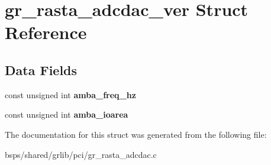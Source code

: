 \hypertarget{structgr__rasta__adcdac__ver}{}\section{gr\+\_\+rasta\+\_\+adcdac\+\_\+ver Struct Reference}
\label{structgr__rasta__adcdac__ver}
\subsection*{Data Fields}
\begin{DoxyCompactItemize}
\item 
\mbox{\label{structgr__rasta__adcdac__ver_af84b68e6409b5581ed521579a220da3f}} 
const unsigned int {\bfseries amba\+\_\+freq\+\_\+hz}
\item 
\mbox{\label{structgr__rasta__adcdac__ver_a5e8c9f504fe8cb9198edb4e89d870933}} 
const unsigned int {\bfseries amba\+\_\+ioarea}
\end{DoxyCompactItemize}


The documentation for this struct was generated from the following file\+:\begin{DoxyCompactItemize}
\item 
bsps/shared/grlib/pci/gr\+\_\+rasta\+\_\+adcdac.\+c\end{DoxyCompactItemize}

